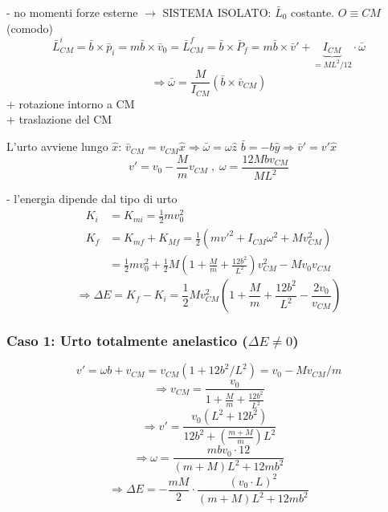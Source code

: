 - no momenti forze esterne $\rightarrow$ SISTEMA ISOLATO: $\bar{L}_0$ costante.
$O \equiv CM$ (comodo)
$$ \bar{L}_{CM}^i = \bar{b} \times \bar{p}_i = m \bar{b} \times \bar{v}_0 = \bar{L}_{CM}^f = \bar{b} \times \bar{P}_f = m \bar{b} \times \bar{v}' + \underbrace{I_{CM}}_{= ML^2/12} \cdot \bar{\omega} $$
$$ \Rightarrow \bar{\omega} = \frac{M}{I_{CM}} (\bar{b} \times \bar{v}_{CM}) $$
+ rotazione intorno a CM \\
+ traslazione del CM

L'urto avviene lungo $\hat{x}$:
$\bar{v}_{CM} = v_{CM} \hat{x} \Rightarrow \bar{\omega} = \omega \hat{z}$
$\bar{b} = -b \hat{y} \Rightarrow \bar{v}' = v' \hat{x}$
$$ v' = v_0 - \frac{M}{m} v_{CM} \; , \; \omega = \frac{12 M b v_{CM}}{M L^2} $$

- l'energia dipende dal tipo di urto
\begin{align*}
K_i &= K_{mi} = \frac{1}{2} m v_0^2 \\
K_f &= K_{mf} + K_{Mf} = \frac{1}{2} (m v'^2 + I_{CM} \omega^2 + M v_{CM}^2) \\
&= \frac{1}{2} m v_0^2 + \frac{1}{2} M \left(1 + \frac{M}{m} + \frac{12 b^2}{L^2}\right) v_{CM}^2 - M v_0 v_{CM}
\end{align*}
$$ \Rightarrow \Delta E = K_f - K_i = \frac{1}{2} M v_{CM}^2 \left( 1 + \frac{M}{m} + \frac{12 b^2}{L^2} - \frac{2 v_0}{v_{CM}} \right) $$

\subsubsection*{Caso 1: Urto totalmente anelastico ($\Delta E \neq 0$)}
\begin{figure}[H]
\centering
{}
\end{figure}

$$ v' = \omega b + v_{CM} = v_{CM} ( 1 + 12b^2/L^2 ) = v_0 - M v_{CM} / m $$
$$ \Rightarrow v_{CM} = \frac{v_0}{1 + \frac{M}{m} + \frac{12 b^2}{L^2}} $$
$$ \Rightarrow v' = \frac{v_0 (L^2 + 12b^2)}{12b^2 + \left(\frac{m+M}{m}\right) L^2} $$
$$ \Rightarrow \omega = \frac{m b v_0 \cdot 12}{(m+M)L^2 + 12 m b^2} $$
$$ \Rightarrow \Delta E = - \frac{m M}{2} \cdot \frac{(v_0 \cdot L)^2}{(m+M)L^2 + 12 m b^2} $$
